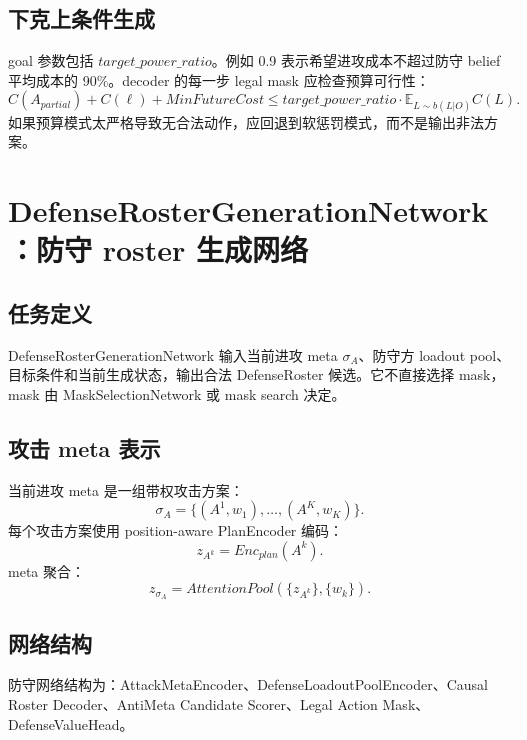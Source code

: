 \documentclass[UTF8,12pt,openany]{ctexbook}
\newcommand{\E}{\mathbb{E}}
\begin{document}
\section{下克上条件生成}
goal 参数包括 $target\_power\_ratio$。例如 0.9 表示希望进攻成本不超过防守 belief 平均成本的 90\%。decoder 的每一步 legal mask 应检查预算可行性：
\begin{equation}
C(A_{partial})+C(\ell)+MinFutureCost\le target\_power\_ratio\cdot \E_{L\sim b(L|O)}C(L).
\end{equation}
如果预算模式太严格导致无合法动作，应回退到软惩罚模式，而不是输出非法方案。


\chapter{DefenseRosterGenerationNetwork：防守 roster 生成网络}

\section{任务定义}
DefenseRosterGenerationNetwork 输入当前进攻 meta $\sigma_A$、防守方 loadout pool、目标条件和当前生成状态，输出合法 DefenseRoster 候选。它不直接选择 mask，mask 由 MaskSelectionNetwork 或 mask search 决定。

\section{攻击 meta 表示}
当前进攻 meta 是一组带权攻击方案：
\begin{equation}
\sigma_A=\{(A^1,w_1),\ldots,(A^K,w_K)\}.
\end{equation}
每个攻击方案使用 position-aware PlanEncoder 编码：
\begin{equation}
z_{A^k}=Enc_{plan}(A^k).
\end{equation}
meta 聚合：
\begin{equation}
z_{\sigma_A}=AttentionPool(\{z_{A^k}\},\{w_k\}).
\end{equation}

\section{网络结构}
防守网络结构为：AttackMetaEncoder、DefenseLoadoutPoolEncoder、Causal Roster Decoder、AntiMeta Candidate Scorer、Legal Action Mask、DefenseValueHead。
\end{document}
